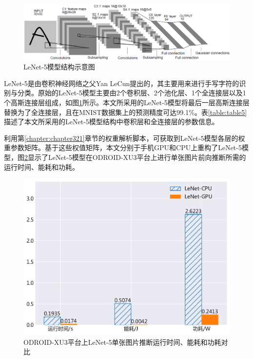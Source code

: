 \begin{figure}[htbp]
    \centering
    \includegraphics[width=1.0\textwidth]{figures/lenet.pdf}
    \caption{LeNet-5模型结构示意图 \cite{lecun1998gradient}}\label{figure:figure15}
\end{figure}

LeNet-5是由卷积神经网络之父Yan LeCun提出的，其主要用来进行手写字符的识别与分类。原始的LeNet-5模型主要由2个卷积层、2个池化层、1个全连接层以及1个高斯连接层组成，如图\ref{figure:figure15}所示。本文所采用的LeNet-5模型将最后一层高斯连接层替换为了全连接层，且在MNIST数据集\cite{lecun.com}上的预测精度可达99.1\%。表\ref{table:table5}描述了本文所采用的LeNet-5模型结构中卷积层和全连接层的参数信息。
\vspace{-1.5em}
\begin{table}[htbp]
  \centering
  \caption{LeNet-5模型结构中的卷积层和全连接层}
  \label{table:table5}
\end{table}
\vspace{-0.5em}

利用第\ref{chapter:chapter321}章节的权重解析脚本，可获取到LeNet-5模型各层的权重参数矩阵。基于这些权值矩阵，本文分别于手机GPU和CPU上重构了LeNet-5模型，图\ref{figure:figure16}显示了LeNet-5模型在ODROID-XU3平台上进行单张图片前向推断所需的运行时间、能耗和功耗。

\begin{figure}[htbp]
    \centering
    \includegraphics[height=0.4\textwidth]{figures/lenet_energy.pdf}
    \caption{ODROID-XU3平台上LeNet-5单张图片推断运行时间、能耗和功耗对比}\label{figure:figure16}
\end{figure}


